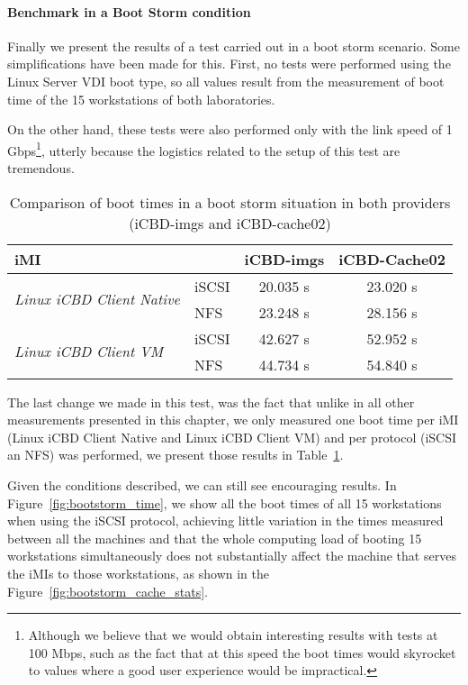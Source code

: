 \paragraph{Benchmark in a Boot Storm condition}
\label{par:eval_cache_bootstorm}


Finally we present the results of a test carried out in a boot storm scenario. Some simplifications have been made for this. First, no tests were performed using the Linux Server VDI boot type, so all values result from the measurement of boot time of the 15 workstations of both laboratories.

On the other hand, these tests were also performed only with the link speed of 1 Gbps\footnote{Although we believe that we would obtain interesting results with tests at 100 Mbps, such as the fact that at this speed the boot times would skyrocket to values where a good user experience would be impractical. }, utterly because the logistics related to the setup of this test are tremendous.


\begin{table}[h]
\centering
\begin{tabular}{llcc}
\textbf{iMI} & \textbf{} & \textbf{iCBD-imgs} & \textbf{iCBD-Cache02} \\ \hline
\multirow{2}{*}{\textit{Linux iCBD Client Native}} & iSCSI & 20.035 s & 23.020 s \\
 & NFS & 23.248 s & 28.156 s \\ \hline
\multirow{2}{*}{\textit{Linux iCBD Client VM}} & iSCSI & 42.627 s & 52.952 s \\
 & NFS & 44.734 s & 54.840 s
\end{tabular}
	\caption{Comparison of boot times in a boot storm situation in both providers (iCBD-imgs and iCBD-cache02)}
	\label{tab:bootstorm_both}
\end{table}

The last change we made in this test, was the fact that unlike in all other measurements presented in this chapter, we only measured one boot time per iMI (Linux iCBD Client Native and Linux iCBD Client VM) and per protocol (iSCSI an NFS) was performed, we present those results in Table~\ref{tab:bootstorm_both}.

Given the conditions described, we can still see encouraging results. In Figure~\ref{fig:bootstorm_time}, we show all the boot times of all 15 workstations when using the iSCSI protocol, achieving little variation in the times measured between all the machines and that the whole computing load of booting 15 workstations simultaneously does not substantially affect the machine that serves the iMIs to those workstations, as shown in the Figure~\ref{fig:bootstorm_cache_stats}.


